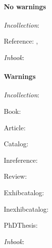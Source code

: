 \documentclass[ngerman]{scrbook}
\begin{document}
\paragraph{No warnings}
\textit{Incollection}: \cite{LoosOrnament}

Reference: \cite{GroveEncycl2011}, \cite{AllgemeinesKunstlerlexikon}

\textit{Inbook}: \cite{Saint-Denis2008}

\paragraph{Warnings}
\textit{Incollection}: \cite{korner2003}

Book: \cite{Satzinger2004}

Article: \cite{Schlegel1992}

Catalog: \cite{KatFrankfurt0510}

Inreference: \cite{Petri2011}

Review: \cite{Dobler2003}

Exhibcatalog: \cite{AusstellungNewYork2013}\cite{AusstellungBonn2005}

Inexhibcatalog: \cite{Giese}\cite{Tjarks2005}

PhDThesis: \cite{strupp1993}

\textit{Inbook}: \cite{Burckhardt2000}

\bigskip

\printbibliography
\end{document}
